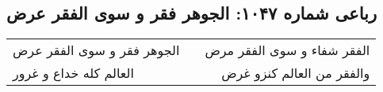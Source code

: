 \begin{center}
\section*{رباعی شماره ۱۰۴۷: الجوهر فقر و سوی الفقر عرض}
\label{sec:1047}
\begin{longtable}{l p{0.5cm} r}
الجوهر فقر و سوی الفقر عرض
&&
الفقر شفاء و سوی الفقر مرض
\\
العالم کله خداع و غرور
&&
والفقر من العالم کنزو غرض
\\
\end{longtable}
\end{center}
